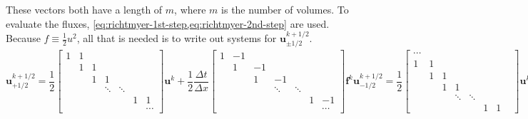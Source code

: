 These vectors both have a length of $m$, where $m$ is the number of volumes.
To evaluate the fluxes, \cref{eq:richtmyer-1st-step,eq:richtmyer-2nd-step} are used.
Because $f\equiv \frac{1}{2}u^2$, all that is needed is to write out systems for $\mathbf{u}_{\pm 1/2}^{k+1/2}$.
\begin{subequations}
    \begin{equation}
        \label{eq:u1/2-system}
        \mathbf{{u}}_{+1/2}^{k+1/2}=\frac{1}{2}
        \begin{bmatrix}
            1 & 1 &   &        &        &   &        \\
            & 1 & 1 &        &        &   &        \\
            &   & 1 & 1      &        &   &        \\
            &   &   & \ddots & \ddots &   &        \\
            &   &   &        &        & 1 & 1      \\
            &   &   &        &        &   & \cdots
        \end{bmatrix}\mathbf{u}^k+\frac{1}{2}\frac{\Delta t}{\Delta x}
        \begin{bmatrix}
            1 & -1 &    &        &        &   &        \\
            & 1  & -1 &        &        &   &        \\
            &    & 1  & -1     &        &   &        \\
            &    &    & \ddots & \ddots &   &        \\
            &    &    &        &        & 1 & -1     \\
            &    &    &        &        &   & \cdots
        \end{bmatrix}\mathbf{f}^k
    \end{equation}
    \begin{equation}
        \label{eq:u-1/2-system}
        \mathbf{{u}}_{-1/2}^{k+1/2}=\frac{1}{2}
        \begin{bmatrix}
            \cdots &   &   &   & & & & \\
            1      & 1 &   &   & & & & \\
            & 1 & 1 &   & & & & \\
            &   & 1 & 1 & & & & \\
            & & & \ddots & \ddots & & \\
            & & & & & 1 & 1

        \end{bmatrix}\mathbf{u}^k+\frac{1}{2}\frac{\Delta t}{\Delta x}
        \begin{bmatrix}
            \cdots &    &    &        &        &    \\
            1      & -1 &    &        &        &    \\
            & 1  & -1 &        &        &    \\
            &    & 1  & -1     &        &    \\
            &    &    & \ddots & \ddots &    \\
            &    &    &        & 1      & -1 \\


\end{bmatrix}
\end{equation}
\end{subequations}
